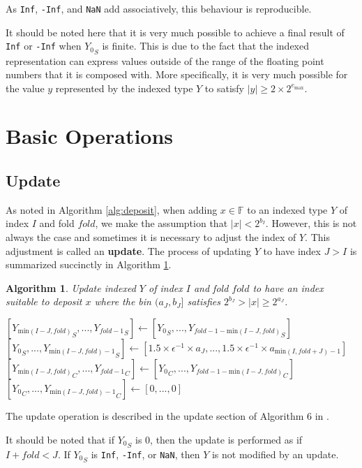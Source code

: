 \documentclass[12pt]{article}
\providecommand{\F}{\ensuremath{\mathbb{F}}}
\providecommand{\min}{\ensuremath{\text{min}}}
\providecommand{\max}{\ensuremath{\text{max}}}
\theoremstyle{plain}
\newtheorem{alg}{Algorithm}[section]
\begin{document}
      As \verb|Inf|, \verb|-Inf|, and \verb|NaN| add associatively, this behaviour is reproducible.

      It should be noted here that it is very much possible to achieve a final result of \verb|Inf| or \verb|-Inf| when ${Y_0}_S$ is finite. This is due to the fact that the indexed representation can express values outside of the range of the floating point numbers that it is composed with. More specifically, it is very much possible for the value $y$ represented by the indexed type $Y$ to satisfy $|y| \geq 2 \times 2^{e_{\max}}$.

\section{Basic Operations}
  \subsection{Update}
    As noted in Algorithm \ref{alg:deposit}, when adding $x \in \F$ to an indexed type $Y$ of index $I$ and fold $fold$, we make the assumption that $|x| < 2^{b_I}$. However, this is not always the case and sometimes it is necessary to adjust the index of $Y$. This adjustment is called an \textbf{update}. The process of updating $Y$ to have index $J > I$ is summarized succinctly in Algorithm \ref{alg:update}.
    \begin{alg}
      Update indexed $Y$ of index $I$ and fold $fold$ to have an index suitable to deposit $x$ where the bin $(a_{J}, b_{J}]$ satisfies $2^{b_{J}} > |x| \geq 2^{a_{J}}$.
      \begin{algorithmic}
            \State $[{Y_{\min(I - J, fold)}}_S, ..., {Y_{fold - 1}}_S] \gets [{Y_0}_S, ..., {Y_{fold - 1 - \min(I - J, fold)}}_S]$
            \State $[{Y_0}_S, ..., {Y_{\min(I - J, fold) - 1}}_S] \gets [1.5 \times \epsilon^{-1} \times a_{J}, ..., 1.5 \times \epsilon^{-1} \times a_{\min(I, fold + J) - 1}]$
            \State $[{Y_{\min(I - J, fold)}}_C, ..., {Y_{fold - 1}}_C] \gets [{Y_0}_C, ..., {Y_{fold - 1 - \min(I - J, fold)}}_C]$
            \State $[{Y_0}_C, ..., {Y_{\min(I - J, fold) - 1}}_C] \gets [0, ..., 0]$
          \EndIf
        \EndFunction
      \end{algorithmic}
      \label{alg:update}
    \end{alg}
    The update operation is described in the update section of Algorithm $6$ in \cite{repsum}.

    It should be noted that if ${Y_0}_S$ is 0, then the update is performed as if $I + fold < J$. If ${Y_0}_S$ is \verb|Inf|, \verb|-Inf|, or \verb|NaN|, then $Y$ is not modified by an update.
\end{document}
